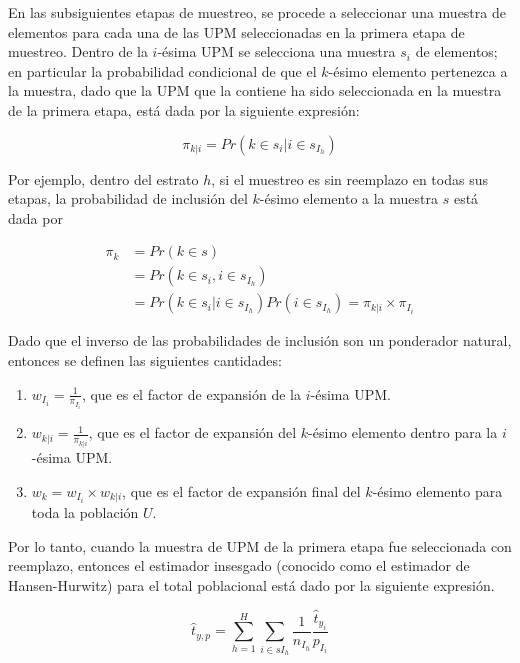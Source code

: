 \documentclass[12pt,spanish,]{book}
\providecommand{\tightlist}{%
  \setlength{\itemsep}{0pt}\setlength{\parskip}{0pt}}
\begin{document}
En las subsiguientes etapas de muestreo, se procede a seleccionar una muestra de elementos para cada una de las UPM seleccionadas en la primera etapa de muestreo. Dentro de la \(i\)-ésima UPM se selecciona una muestra \(s_i\) de elementos; en particular la probabilidad condicional de que el \(k\)-ésimo elemento pertenezca a la muestra, dado que la UPM que la contiene ha sido seleccionada en la muestra de la primera etapa, está dada por la siguiente expresión:

\begin{equation*}
\pi_{k|i} = Pr(k \in s_i | i \in s_{I_h})
\end{equation*}

Por ejemplo, dentro del estrato \(h\), si el muestreo es sin reemplazo en todas sus etapas, la probabilidad de inclusión del \(k\)-ésimo elemento a la muestra \(s\) está dada por

\begin{align*}
\label{piki}
\pi_k & = Pr(k \in s)\\ 
& = Pr(k \in s_i, i \in s_{I_h}) \\
& = Pr(k \in s_i | i \in s_{I_h}) Pr(i \in s_{I_h}) = \pi_{k|i} \times \pi_{I_i}
\end{align*}

Dado que el inverso de las probabilidades de inclusión son un ponderador natural, entonces se definen las siguientes cantidades:

\begin{enumerate}
\def\labelenumi{\arabic{enumi}.}
\tightlist
\item
  \(w_{I_i} = \frac{1}{\pi_{I_i}}\), que es el factor de expansión de la \(i\)-ésima UPM.
\item
  \(w_{k|i} = \frac{1}{\pi_{k|i}}\), que es el factor de expansión del \(k\)-ésimo elemento dentro para la \(i\)-ésima UPM.
\item
  \(w_k = w_{I_i} \times w_{k|i}\), que es el factor de expansión final del \(k\)-ésimo elemento para toda la población \(U\).
\end{enumerate}

Por lo tanto, cuando la muestra de UPM de la primera etapa fue seleccionada con reemplazo, entonces el estimador insesgado (conocido como el estimador de Hansen-Hurwitz) para el total poblacional está dado por la siguiente expresión.

\begin{equation}
\label{HH}
\hat{t}_{y,p}=\sum_{h=1}^H \sum_{i \in sI_h}\frac{1}{n_{I_h}}\frac{\hat{t}_{y_i}}{p_{I_i}}
\end{equation}
\end{document}

